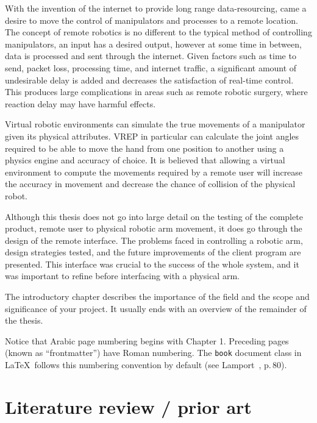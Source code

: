 \documentclass[12pt,openany,a4paper]{book}
\begin{document}
With the invention of the internet to provide long range data-resourcing, came a desire to move the control of manipulators and processes to a remote location. The concept of remote robotics is no different to the typical method of controlling manipulators, an input has a desired output, however at some time in between, data is processed and sent through the internet. Given factors such as time to send, packet loss, processing time, and internet traffic, a significant amount of undesirable delay is added and decreases the satisfaction of real-time control. This produces large complications in areas such as remote robotic surgery, where reaction delay may have harmful effects.

Virtual robotic environments can simulate the true movements of a manipulator given its physical attributes. VREP in particular can calculate the joint angles required to be able to move the hand from one position to another using a physics engine and accuracy of choice. It is believed that allowing a virtual environment to compute the movements required by a remote user will increase the accuracy in movement and decrease the chance of collision of the physical robot.

Although this thesis does not go into large detail on the testing of the complete product, remote user to physical robotic arm movement, it does go through the design of the remote interface. The problems faced in controlling a robotic arm, design strategies tested, and the future improvements of the client program are presented. This interface was crucial to the success of the whole system, and it was important to refine before interfacing with a physical arm. %




The introductory chapter describes the importance of the field and the
scope and significance of your project.  It usually ends with an
overview of the remainder of the thesis.

Notice that Arabic page numbering begins with Chapter 1.  Preceding
pages (known as ``frontmatter'') have Roman numbering.  The
\texttt{book} document class in \LaTeX\ follows this numbering
convention by default (see Lamport~\cite{lamport}, p.\,80).




\chapter{Literature review / prior art}
\end{document}
